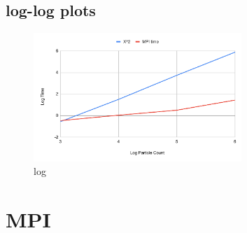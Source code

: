 \documentclass{article}
\begin{document}
\subsection{log-log plots}
\begin{figure}[H] %
\centering %
\includegraphics[width=0.7\textwidth]{figures/loglog.pdf} %
\caption{log} %
\label{log} %
\end{figure}

\section{MPI}
\end{document}
